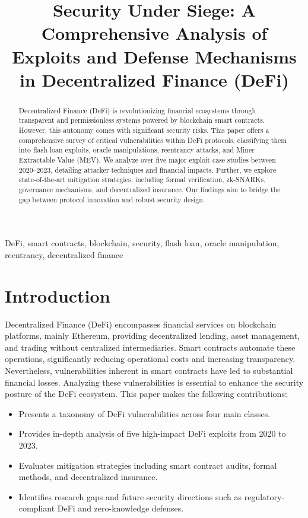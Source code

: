\documentclass[conference]{IEEEtran}
\title{Security Under Siege: A Comprehensive Analysis of Exploits and Defense Mechanisms in Decentralized Finance (DeFi)}
\author{\IEEEauthorblockN{ZAKI ABADI BIN PUTEH and MARSHITAH BINTI MAZLAN}
\IEEEauthorblockA{Department of Information Systems\\
Hanyang University Seoul, South Korea \\
zakotto@hanyang.ac.kr, marshi29@hanyang.ac.kr}}
\begin{document}
\maketitle

\begin{abstract}
Decentralized Finance (DeFi) is revolutionizing financial ecosystems through transparent and permissionless systems powered by blockchain smart contracts. However, this autonomy comes with significant security risks. This paper offers a comprehensive survey of critical vulnerabilities within DeFi protocols, classifying them into flash loan exploits, oracle manipulations, reentrancy attacks, and Miner Extractable Value (MEV). We analyze over five major exploit case studies between 2020–2023, detailing attacker techniques and financial impacts. Further, we explore state-of-the-art mitigation strategies, including formal verification, zk-SNARKs, governance mechanisms, and decentralized insurance. Our findings aim to bridge the gap between protocol innovation and robust security design.
\end{abstract}

\begin{IEEEkeywords}
DeFi, smart contracts, blockchain, security, flash loan, oracle manipulation, reentrancy, decentralized finance
\end{IEEEkeywords}

\section{Introduction}
Decentralized Finance (DeFi) encompasses financial services on blockchain platforms, mainly Ethereum, providing decentralized lending, asset management, and trading without centralized intermediaries. Smart contracts automate these operations, significantly reducing operational costs and increasing transparency. Nevertheless, vulnerabilities inherent in smart contracts have led to substantial financial losses. Analyzing these vulnerabilities is essential to enhance the security posture of the DeFi ecosystem.
This paper makes the following contributions:
\begin{itemize}
  \item Presents a taxonomy of DeFi vulnerabilities across four main classes.
  \item Provides in-depth analysis of five high-impact DeFi exploits from 2020 to 2023.
  \item Evaluates mitigation strategies including smart contract audits, formal methods, and decentralized insurance.
  \item Identifies research gaps and future security directions such as regulatory-compliant DeFi and zero-knowledge defenses.
\end{itemize}
\end{document}
